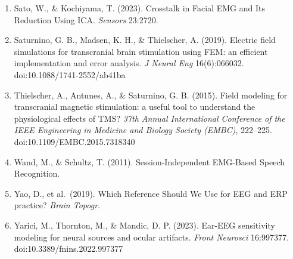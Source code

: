 \documentclass[
  11pt,
]{article}
\begin{document}
\begin{enumerate}
\item
  Sato, W., \& Kochiyama, T. (2023). Crosstalk in Facial EMG and Its Reduction Using ICA. \emph{Sensors} 23:2720.
\item
  Saturnino, G. B., Madsen, K. H., \& Thielscher, A. (2019). Electric field simulations for transcranial brain stimulation using FEM: an efficient implementation and error analysis. \emph{J Neural Eng} 16(6):066032. doi:10.1088/1741-2552/ab41ba
\item
  Thielscher, A., Antunes, A., \& Saturnino, G. B. (2015). Field modeling for transcranial magnetic stimulation: a useful tool to understand the physiological effects of TMS? \emph{37th Annual International Conference of the IEEE Engineering in Medicine and Biology Society (EMBC)}, 222--225. doi:10.1109/EMBC.2015.7318340
\item
  Wand, M., \& Schultz, T. (2011). Session-Independent EMG-Based Speech Recognition.
\item
  Yao, D., et al.~(2019). Which Reference Should We Use for EEG and ERP practice? \emph{Brain Topogr}.
\item
  Yarici, M., Thornton, M., \& Mandic, D. P. (2023). Ear-EEG sensitivity modeling for neural sources and ocular artifacts. \emph{Front Neurosci} 16:997377. doi:10.3389/fnins.2022.997377
\end{enumerate}
\end{document}
